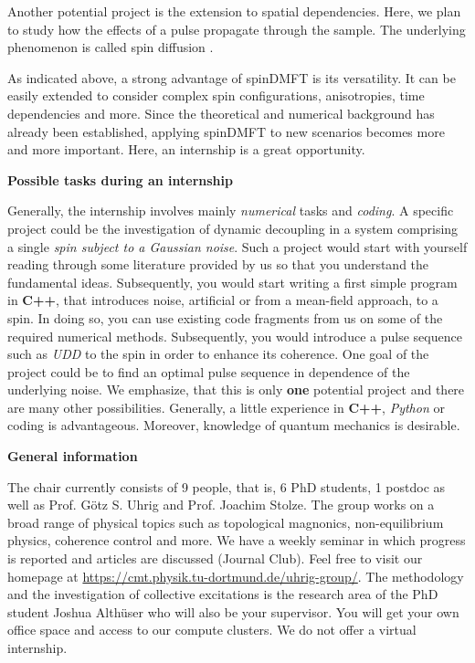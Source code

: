 \documentclass[20pt]{article}
\newcommand{\msection}[1]{ { \vspace{5mm} \hspace{-6mm} \large \textbf{#1}} \vspace{2mm} } %
\begin{document}
Another potential project is the extension to spatial dependencies. Here, we plan to study how the effects of a pulse propagate through the sample. 
The underlying phenomenon is called spin diffusion \cite{zu21}.

As indicated above, a strong advantage of spinDMFT is its versatility. It can be easily extended to consider complex spin 
configurations, anisotropies, time dependencies and more. Since the theoretical and numerical background has already been established, applying spinDMFT to new 
scenarios becomes more and more important. Here, an internship is a great opportunity.


\msection{Possible tasks during an internship}

Generally, the internship involves mainly \emph{numerical} tasks and \emph{coding}. 
A specific project could be the investigation of dynamic decoupling in a system comprising a single \emph{spin subject to a Gaussian noise}. Such a project would start
with yourself reading through some literature provided by us so that you understand the fundamental ideas. Subsequently, you would start writing a first simple program in \textbf{C++}, 
that introduces noise, artificial or from a mean-field approach, to a spin. In doing so, you can use existing code fragments from us on some of the required numerical methods. Subsequently, 
you would introduce a pulse sequence such as \emph{UDD} \cite{uhrig07} to the spin in order to enhance its coherence.
One goal of the project could be to find an optimal pulse sequence in dependence of the underlying noise. We emphasize, that this is only \textbf{one} potential project 
and there are many other possibilities. Generally, a little experience 
in \textbf{C++}, \emph{Python} or coding is advantageous. Moreover, knowledge of quantum mechanics is desirable.


\msection{General information}

The chair currently consists of 9 people, that is, 6 PhD students, 1 postdoc as well as Prof. G\"otz S. Uhrig and Prof. Joachim Stolze. The group 
works on a broad range of physical topics such as topological magnonics, non-equilibrium physics, coherence control and more. We have a weekly seminar in which
progress is reported and articles are discussed (Journal Club). Feel free to visit our homepage 
at \url{https://cmt.physik.tu-dortmund.de/uhrig-group/}. 
The methodology and the investigation of collective excitations is the research area of the PhD student Joshua Alth\"user who will also be your supervisor.
You will get your own office space and access to our compute clusters. We do not offer a virtual internship.

 

\end{document}
